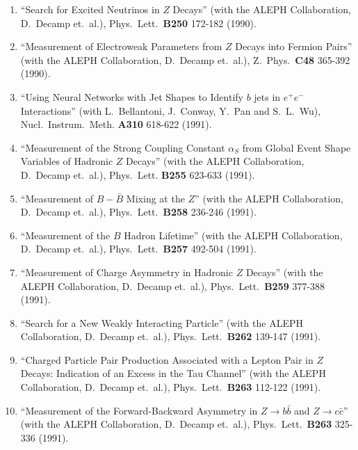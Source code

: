 \begin{enumerate}

\item ``Search for Excited Neutrinos in $Z$ Decays'' (with the ALEPH
  Collaboration, D.~Decamp et.~al.), Phys.~Lett.~{\bf B250} 172-182
  (1990).

\item ``Measurement of Electroweak Parameters from $Z$ Decays into
  Fermion Pairs'' (with the ALEPH Collaboration, D.~Decamp et.~al.),
  Z.~Phys.~{\bf C48} 365-392 (1990).

\item ``Using Neural Networks with Jet Shapes to Identify $b$ jets in
  $e^+ e^-$ Interactions'' (with L.~Bellantoni, J.~Conway, Y.~Pan and
  S.~L.~Wu), Nucl.~Instrum.~Meth. {\bf A310} 618-622 (1991).

\item ``Measurement of the Strong Coupling Constant $\alpha_S$ from
  Global Event Shape Variables of Hadronic $Z$ Decays'' (with the
  ALEPH Collaboration, D.~Decamp et.~al.), Phys.~Lett. {\bf B255}
  623-633 (1991).

\item ``Measurement of $B - \bar B$ Mixing at the $Z$'' (with the
  ALEPH Collaboration, D.~Decamp et.~al.), Phys.~Lett.~{\bf B258}
  236-246 (1991).

\item ``Measurement of the $B$ Hadron Lifetime'' (with the ALEPH
  Collaboration, D.~Decamp et.~al.), Phys.~Lett.~{\bf B257} 492-504
  (1991).

\item ``Measurement of Charge Asymmetry in Hadronic $Z$ Decays'' (with
  the ALEPH Collaboration, D.~Decamp et.~al.), Phys.~Lett.~{\bf B259}
  377-388 (1991).

\item ``Search for a New Weakly Interacting Particle'' (with the ALEPH
  Collaboration, D.~Decamp et.~al.), Phys.~Lett.~{\bf B262} 139-147
  (1991).

\item ``Charged Particle Pair Production Associated with a Lepton Pair
  in $Z$ Decays: Indication of an Excess in the Tau Channel'' (with
  the ALEPH Collaboration, D.~Decamp et.~al.), Phys.~Lett.~{\bf B263}
  112-122 (1991).

\item ``Measurement of the Forward-Backward Asymmetry in $Z
  \rightarrow b \bar b$ and $Z \rightarrow c \bar c$'' (with the ALEPH
  Collaboration, D.~Decamp et.~al.), Phys.~Lett.~{\bf B263} 325-336
  (1991).


\end{enumerate}
